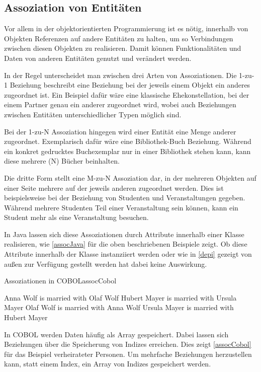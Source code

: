 \subsection{Assoziation von Entitäten}

Vor allem in der objektorientierten Programmierung ist es nötig, innerhalb von Objekten Referenzen auf andere Entitäten zu halten, um so Verbindungen zwischen diesen Objekten zu realisieren. Damit können Funktionalitäten und Daten von anderen Entitäten genutzt und verändert werden. 

In der Regel unterscheidet man zwischen drei Arten von Assoziationen. Die 1-zu-1 Beziehung beschreibt eine Beziehung bei der jeweils einem Objekt ein anderes zugeordnet ist. Ein Beispiel dafür wäre eine klassische Ehekonstellation, bei der einem Partner genau ein anderer zugeordnet wird, wobei auch Beziehungen zwischen Entitäten unterschiedlicher Typen möglich sind. 

Bei der 1-zu-N Assoziation hingegen wird einer Entität eine Menge anderer zugeordnet. Exemplarisch dafür wäre eine Bibliothek-Buch Beziehung. Während ein konkret gedrucktes Buchexemplar nur in einer Bibliothek stehen kann, kann diese mehrere (N) Bücher beinhalten. 

Die dritte Form stellt eine M-zu-N Assoziation dar, in der mehreren Objekten auf einer Seite mehrere auf der jeweils anderen zugeordnet werden. Dies ist beispielsweise bei der Beziehung von Studenten und Veranstaltungen gegeben. Während mehrere Studenten Teil einer Veranstaltung sein können, kann ein Student mehr als eine Veranstaltung besuchen.


In Java lassen sich diese Assoziationen durch Attribute innerhalb einer Klasse realisieren, wie \autoref{assocJava} für die oben beschriebenen Beispiele zeigt. Ob diese Attribute innerhalb der Klasse instanziiert werden oder wie in \autoref{depi} gezeigt von außen zur Verfügung gestellt werden hat dabei keine Auswirkung.

\begin{codeWithCaption}{Assoziationen in COBOL}{assocCobol}
    \begin{shellwindow}
      Anna   Wolf is married with   Olaf   Wolf
    Hubert  Mayer is married with Ursula  Mayer
      Olaf   Wolf is married with   Anna   Wolf
    Ursula  Mayer is married with Hubert  Mayer
    \end{shellwindow}
\end{codeWithCaption}

In COBOL werden Daten häufig als Array gespeichert. Dabei lassen sich Beziehungen über die Speicherung von Indizes erreichen. Dies zeigt \autoref{assocCobol} für das Beispiel verheirateter Personen. Um mehrfache Beziehungen herzustellen kann, statt einem Index, ein Array von Indizes gespeichert werden.